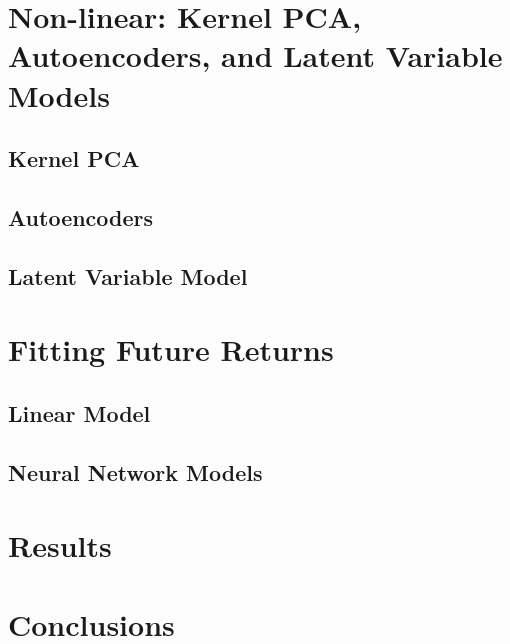 \documentclass{article}
\begin{document}
\section{Non-linear: Kernel PCA, Autoencoders, and Latent Variable Models}

\subsection{Kernel PCA}
\subsection{Autoencoders}
\subsection{Latent Variable Model}

\section{Fitting Future Returns}

\subsection{Linear Model}

\subsection{Neural Network Models}

\section{Results}


\section{Conclusions}
\end{document}
